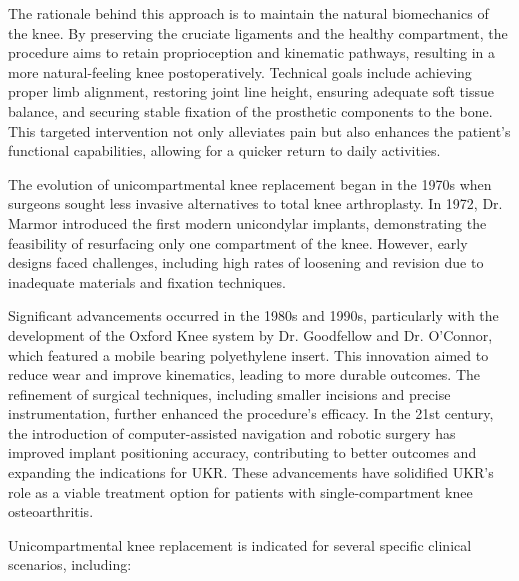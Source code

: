 The rationale behind this approach is to maintain the natural biomechanics of the knee. By preserving the cruciate ligaments and the healthy compartment, the procedure aims to retain proprioception and kinematic pathways, resulting in a more natural-feeling knee postoperatively. Technical goals include achieving proper limb alignment, restoring joint line height, ensuring adequate soft tissue balance, and securing stable fixation of the prosthetic components to the bone. This targeted intervention not only alleviates pain but also enhances the patient's functional capabilities, allowing for a quicker return to daily activities.

The evolution of unicompartmental knee replacement began in the 1970s when surgeons sought less invasive alternatives to total knee arthroplasty. In 1972, Dr. Marmor introduced the first modern unicondylar implants, demonstrating the feasibility of resurfacing only one compartment of the knee. However, early designs faced challenges, including high rates of loosening and revision due to inadequate materials and fixation techniques.

Significant advancements occurred in the 1980s and 1990s, particularly with the development of the Oxford Knee system by Dr. Goodfellow and Dr. O'Connor, which featured a mobile bearing polyethylene insert. This innovation aimed to reduce wear and improve kinematics, leading to more durable outcomes. The refinement of surgical techniques, including smaller incisions and precise instrumentation, further enhanced the procedure's efficacy. In the 21st century, the introduction of computer-assisted navigation and robotic surgery has improved implant positioning accuracy, contributing to better outcomes and expanding the indications for UKR. These advancements have solidified UKR's role as a viable treatment option for patients with single-compartment knee osteoarthritis.

Unicompartmental knee replacement is indicated for several specific clinical scenarios, including:

